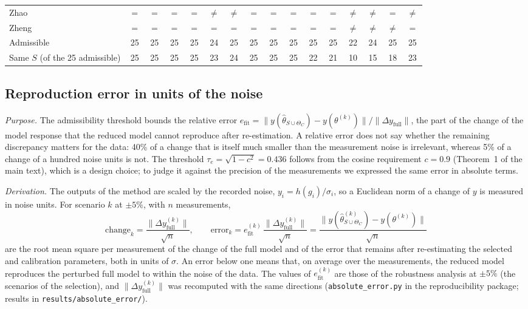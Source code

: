{\begin{longtable}{@{}lccccccccccccccc@{}}
Zhao & $=$ & $=$ & $=$ & $=$ & $\neq$ & $\neq$ & $=$ & $=$ & $=$ & $=$ & $=$ & $\neq$ & $\neq$ & $=$ & $\neq$ \\
Zheng & $=$ & $=$ & $=$ & $=$ & $=$ & $=$ & $=$ & $=$ & $=$ & $=$ & $=$ & $\neq$ & $\neq$ & $\neq$ & $=$ \\
\midrule
Admissible & 25 & 25 & 25 & 25 & 24 & 25 & 25 & 25 & 25 & 25 & 25 & 22 & 24 & 25 & 25 \\
Same $S$ (of the 25 admissible) & 25 & 25 & 25 & 25 & 23 & 24 & 25 & 25 & 25 & 22 & 21 & 10 & 15 & 18 & 23 \\
\bottomrule \end{longtable}}


\subsection*{Reproduction error in units of the noise}
\emph{Purpose.} The admissibility threshold bounds the relative error $e_{\mathrm{fit}}=\|y(\hat\theta_{S\cup\Theta_C})-y(\theta^{(k)})\|/\|\Delta y_{\mathrm{full}}\|$, the part of the change of the model response that the reduced model cannot reproduce after re-estimation. A relative error does not say whether the remaining discrepancy matters for the data: 40\% of a change that is itself much smaller than the measurement noise is irrelevant, whereas 5\% of a change of a hundred noise units is not. The threshold $\tau_e=\sqrt{1-c^2}=0.436$ follows from the cosine requirement $c=0.9$ (Theorem~1 of the main text), which is a design choice; to judge it against the precision of the measurements we expressed the same error in absolute terms.

\emph{Derivation.} The outputs of the method are scaled by the recorded noise, $y_i=h(g_i)/\sigma_i$, so a Euclidean norm of a change of $y$ is measured in noise units. For scenario $k$ at $\pm5\%$, with $n$ measurements,
\[ \text{change}_k=\frac{\|\Delta y^{(k)}_{\mathrm{full}}\|}{\sqrt n},\qquad \text{error}_k=e^{(k)}_{\mathrm{fit}}\,\frac{\|\Delta y^{(k)}_{\mathrm{full}}\|}{\sqrt n}=\frac{\|y(\hat\theta^{(k)}_{S\cup\Theta_C})-y(\theta^{(k)})\|}{\sqrt n} \]
are the root mean square per measurement of the change of the full model and of the error that remains after re-estimating the selected and calibration parameters, both in units of $\sigma$. An error below one means that, on average over the measurements, the reduced model reproduces the perturbed full model to within the noise of the data. The values of $e^{(k)}_{\mathrm{fit}}$ are those of the robustness analysis at $\pm5\%$ (the scenarios of the selection), and $\|\Delta y^{(k)}_{\mathrm{full}}\|$ was recomputed with the same directions (\texttt{absolute\_error.py} in the reproducibility package; results in \texttt{results/absolute\_error/}).

